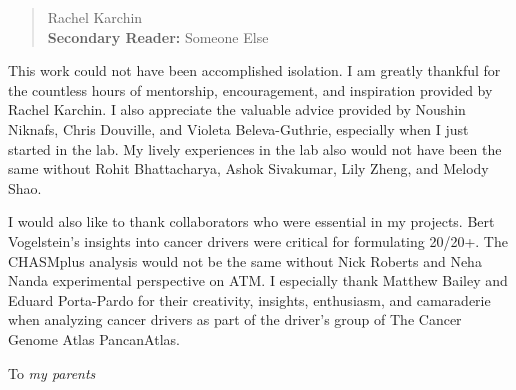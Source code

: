 \begin{frontmatter}
\begin{abstract}
\vfill
{} Rachel Karchin \\
{\bf{Secondary Reader:}} Someone Else
\end{abstract}

\begin{acknowledgment}

This work could not have been accomplished isolation. I am greatly thankful for the countless hours of mentorship, encouragement, and inspiration provided by Rachel Karchin. I also appreciate the valuable advice provided by Noushin Niknafs, Chris Douville, and Violeta Beleva-Guthrie, especially when I just started in the lab. My lively experiences in the lab also would not have been the same without Rohit Bhattacharya, Ashok Sivakumar, Lily Zheng, and Melody Shao.

I would also like to thank collaborators who were essential in my projects. Bert Vogelstein's insights into cancer drivers were critical for formulating 20/20+. The CHASMplus analysis would not be the same without Nick Roberts and Neha Nanda experimental perspective on ATM. I especially thank Matthew Bailey and Eduard Porta-Pardo for their creativity, insights, enthusiasm, and camaraderie when analyzing cancer drivers as part of the driver's group of The Cancer Genome Atlas PancanAtlas.

\end{acknowledgment}

\begin{dedication}
 
To \textit{my parents}

\end{dedication}

\tableofcontents

\listoftables

\listoffigures

\end{frontmatter}
